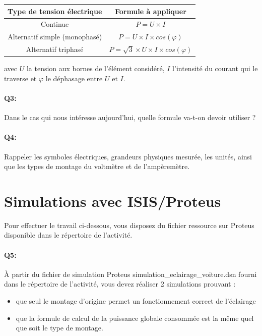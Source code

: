 \documentclass{article}
\begin{document}
\begin{center}
	\begin{tabular}{|c|c|}
		\hline
		Type de tension électrique & Formule à appliquer \\
		\hline
		\hline
		Continue & $P = U \times I$\\
		\hline
		Alternatif simple (monophasé) & $P = U \times I \times cos(\varphi)$ \\
		\hline
		Alternatif triphasé & $P = \sqrt{3} \times U \times I \times cos(\varphi)$\\
	
		\hline
	\end{tabular}

	avec $U$ la tension aux bornes de l’élément considéré, $I$ l’intensité du courant qui le traverse
	et $\varphi$ le déphasage entre $U$ et $I$.
\end{center}

\vspace{1em}
\paragraph{Q3:} Dans le cas qui nous intéresse aujourd’hui, quelle formule va-t-on devoir utiliser ?

\paragraph{Q4:} Rappeler les symboles électriques, grandeurs physiques mesurée, les unités, ainsi que les types de montage du voltmètre et de l'ampèremètre.

\section{Simulations avec ISIS/Proteus}
Pour effectuer le travail ci-dessous, vous disposez du fichier ressource sur Proteus disponible dans le répertoire de l’activité.

\paragraph{Q5:} À partir du fichier de simulation Proteus \og{}simulation\_eclairage\_voiture.dsn\fg{} 
fourni dans le répertoire de l’activité, vous devez réaliser 2 simulations prouvant :
\begin{itemize}
	\item que seul le montage d’origine permet un fonctionnement correct de l’éclairage
	\item que la formule de calcul de la puissance globale consommée est la même quel que soit le type de montage.
\end{itemize}
\end{document}
